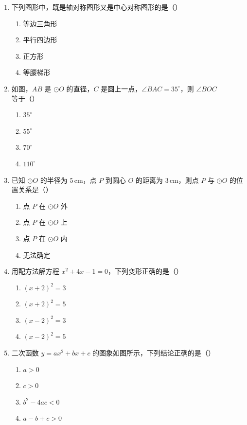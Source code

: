\documentclass[12pt, a4paper]{ctexart}
\begin{document}
\begin{enumerate}[label=\arabic*.]
\item 下列图形中，既是轴对称图形又是中心对称图形的是（\quad）
\begin{enumerate}[label=\Alph*.]
\item 等边三角形
\item 平行四边形
\item 正方形
\item 等腰梯形
\end{enumerate}

\item 如图，$AB$ 是 $\odot O$ 的直径，$C$ 是圆上一点，$\angle BAC = 35^\circ$，则 $\angle BOC$ 等于（\quad）
\begin{enumerate}[label=\Alph*.]
\item $35^\circ$
\item $55^\circ$
\item $70^\circ$
\item $110^\circ$
\end{enumerate}

\item 已知 $\odot O$ 的半径为 $5\,\text{cm}$，点 $P$ 到圆心 $O$ 的距离为 $3\,\text{cm}$，则点 $P$ 与 $\odot O$ 的位置关系是（\quad）
\begin{enumerate}[label=\Alph*.]
\item 点 $P$ 在 $\odot O$ 外
\item 点 $P$ 在 $\odot O$ 上
\item 点 $P$ 在 $\odot O$ 内
\item 无法确定
\end{enumerate}

\item 用配方法解方程 $x^2 + 4x - 1 = 0$，下列变形正确的是（\quad）
\begin{enumerate}[label=\Alph*.]
\item $(x + 2)^2 = 3$
\item $(x + 2)^2 = 5$
\item $(x - 2)^2 = 3$
\item $(x - 2)^2 = 5$
\end{enumerate}

\item 二次函数 $y = ax^2 + bx + c$ 的图象如图所示，下列结论正确的是（\quad）


\begin{enumerate}[label=\Alph*.]
\item $a > 0$
\item $c > 0$
\item $b^2 - 4ac < 0$
\item $a - b + c > 0$
\end{enumerate}

\end{enumerate}
\end{document}
